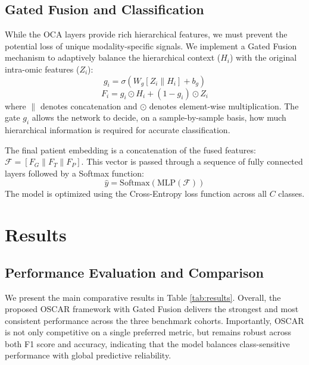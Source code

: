\documentclass[lettersize,journal]{IEEEtran}
\begin{document}
\subsection{Gated Fusion and Classification}
While the OCA layers provide rich hierarchical features, we must prevent the potential loss of unique modality-specific signals. We implement a Gated Fusion mechanism to adaptively balance the hierarchical context ($H_i$) with the original intra-omic features ($Z_i$):
\begin{equation}
    g_i = \sigma(W_g[Z_i \parallel H_i] + b_g)
\end{equation}
\begin{equation}
    F_i = g_i \odot H_i + (1 - g_i) \odot Z_i
\end{equation}
where $\parallel$ denotes concatenation and $\odot$ denotes element-wise multiplication. The gate $g_i$ allows the network to decide, on a sample-by-sample basis, how much hierarchical information is required for accurate classification.

The final patient embedding is a concatenation of the fused features: $\mathcal{F} = [F_G \parallel F_T \parallel F_P]$. This vector is passed through a sequence of fully connected layers followed by a Softmax function:
\begin{equation}
    \hat{y} = \text{Softmax}(\text{MLP}(\mathcal{F}))
\end{equation}
The model is optimized using the Cross-Entropy loss function across all $C$ classes.




\section{Results}
\subsection{Performance Evaluation and Comparison}

We present the main comparative results in Table \ref{tab:results}. Overall, the proposed OSCAR framework with Gated Fusion delivers the strongest and most consistent performance across the three benchmark cohorts. Importantly, OSCAR is not only competitive on a single preferred metric, but remains robust across both F1 score and accuracy, indicating that the model balances class-sensitive performance with global predictive reliability.
\end{document}
